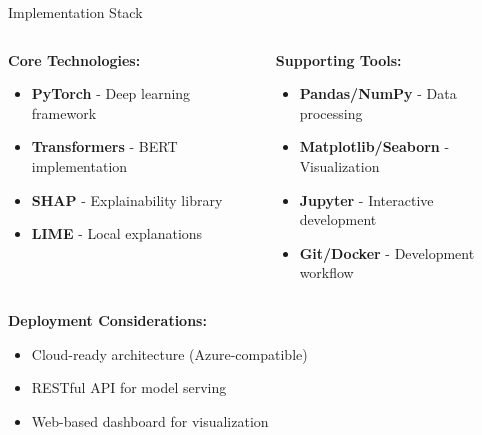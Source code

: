 \begin{frame}{Implementation Stack}
\begin{columns}
\begin{column}{0.5\textwidth}
\textbf{Core Technologies:}
\begin{itemize}
    \item \textbf{PyTorch} - Deep learning framework
    \item \textbf{Transformers} - BERT implementation
    \item \textbf{SHAP} - Explainability library
    \item \textbf{LIME} - Local explanations
\end{itemize}
\end{column}
\begin{column}{0.5\textwidth}
\textbf{Supporting Tools:}
\begin{itemize}
    \item \textbf{Pandas/NumPy} - Data processing
    \item \textbf{Matplotlib/Seaborn} - Visualization
    \item \textbf{Jupyter} - Interactive development
    \item \textbf{Git/Docker} - Development workflow
\end{itemize}
\end{column}
\end{columns}

\vspace{0.5cm}
\textbf{Deployment Considerations:}
\begin{itemize}
    \item Cloud-ready architecture (Azure-compatible)
    \item RESTful API for model serving
    \item Web-based dashboard for visualization
\end{itemize}
\end{frame}
